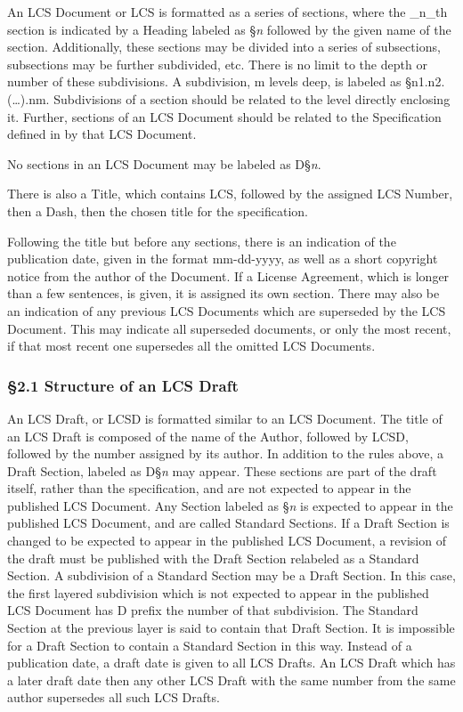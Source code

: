 An LCS Document or LCS is formatted as a series of sections, where the
\_n\_th section is indicated by a Heading labeled as §\emph{n} followed
by the given name of the section. Additionally, these sections may be
divided into a series of subsections, subsections may be further
subdivided, etc. There is no limit to the depth or number of these
subdivisions. A subdivision, m levels deep, is labeled as
§n1.n2.(\ldots).nm. Subdivisions of a section should be related to the
level directly enclosing it. Further, sections of an LCS Document should
be related to the Specification defined in by that LCS Document.

No sections in an LCS Document may be labeled as D§\emph{n}.

There is also a Title, which contains LCS, followed by the assigned LCS
Number, then a Dash, then the chosen title for the specification.

Following the title but before any sections, there is an indication of
the publication date, given in the format mm-dd-yyyy, as well as a short
copyright notice from the author of the Document. If a License
Agreement, which is longer than a few sentences, is given, it is
assigned its own section. There may also be an indication of any
previous LCS Documents which are superseded by the LCS Document. This
may indicate all superseded documents, or only the most recent, if that
most recent one supersedes all the omitted LCS Documents.

\hypertarget{structure-of-an-lcs-draft}{%
\subsubsection{§2.1 Structure of an LCS
Draft}\label{structure-of-an-lcs-draft}}

An LCS Draft, or LCSD is formatted similar to an LCS Document. The title
of an LCS Draft is composed of the name of the Author, followed by LCSD,
followed by the number assigned by its author. In addition to the rules
above, a Draft Section, labeled as D§\emph{n} may appear. These sections
are part of the draft itself, rather than the specification, and are not
expected to appear in the published LCS Document. Any Section labeled as
§\emph{n} is expected to appear in the published LCS Document, and are
called Standard Sections. If a Draft Section is changed to be expected
to appear in the published LCS Document, a revision of the draft must be
published with the Draft Section relabeled as a Standard Section. A
subdivision of a Standard Section may be a Draft Section. In this case,
the first layered subdivision which is not expected to appear in the
published LCS Document has D prefix the number of that subdivision. The
Standard Section at the previous layer is said to contain that Draft
Section. It is impossible for a Draft Section to contain a Standard
Section in this way. Instead of a publication date, a draft date is
given to all LCS Drafts. An LCS Draft which has a later draft date then
any other LCS Draft with the same number from the same author supersedes
all such LCS Drafts.

